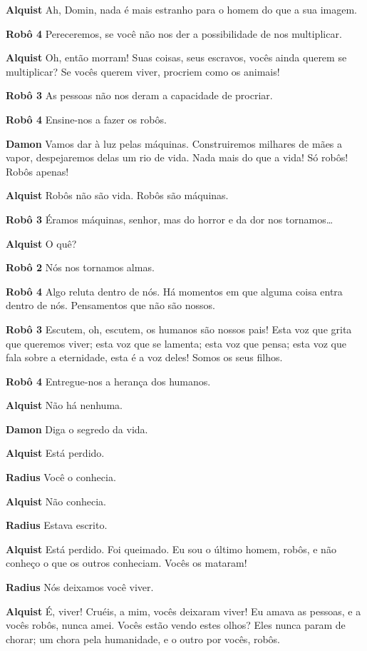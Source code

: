 \textbf{Alquist} Ah, Domin, nada é mais estranho para o homem do que a sua imagem.

\textbf{Robô 4} Pereceremos, se você não nos der a possibilidade de nos multiplicar.

\textbf{Alquist} Oh, então morram! Suas coisas, seus escravos, vocês ainda querem se
multiplicar? Se vocês querem viver, procriem como os animais!

\textbf{Robô 3} As pessoas não nos deram a capacidade de procriar.

\textbf{Robô 4} Ensine-nos a fazer os robôs.

\textbf{Damon} Vamos dar à luz pelas máquinas. Construiremos milhares de mães a vapor,
despejaremos delas um rio de vida. Nada mais do que a vida! Só robôs!  Robôs apenas!

\textbf{Alquist} Robôs não são vida. Robôs são máquinas.

\textbf{Robô 3} Éramos máquinas, senhor, mas do horror e da dor nos tornamos\ldots{}

\textbf{Alquist} O quê?

\textbf{Robô 2} Nós nos tornamos almas.

\textbf{Robô 4} Algo reluta dentro de nós. Há momentos em que alguma coisa
entra dentro de nós. Pensamentos que não são nossos.

\textbf{Robô 3} Escutem, oh, escutem, os humanos são nossos pais! Esta voz que grita
que queremos viver; esta voz que se lamenta; esta voz que pensa; esta voz que
fala sobre a eternidade, esta é a voz deles! Somos os seus filhos.

\textbf{Robô 4} Entregue-nos a herança dos humanos.

\textbf{Alquist} Não há nenhuma.

\textbf{Damon} Diga o segredo da vida.

\textbf{Alquist} Está perdido.

\textbf{Radius} Você o conhecia.

\textbf{Alquist} Não conhecia.

\textbf{Radius} Estava escrito.

\textbf{Alquist} Está perdido. Foi queimado. Eu sou o último homem, robôs, e não conheço
o que os outros conheciam. Vocês os mataram!

\textbf{Radius} Nós deixamos você viver.

\textbf{Alquist} É, viver! Cruéis, a mim, vocês deixaram viver! Eu amava as pessoas, e a
vocês robôs, nunca amei. Vocês estão vendo estes olhos? Eles nunca param de
chorar; um chora pela humanidade, e o outro por vocês, robôs.

